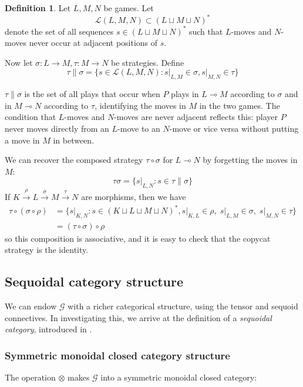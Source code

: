 \documentclass[11pt]{article} %
\theoremstyle{plain} %
\theoremstyle{definition} %
\newtheorem{definition}[theorem]{Definition}
\theoremstyle{exercisestyle}
\newcommand{\map}[3]{#2\xrightarrow{#1} #3}
\newcommand*\from{\colon}
\newcommand{\cmap}[3]{#1\from{}#2\to{}#3}
\newcommand{\tensor}{\otimes}
\renewcommand{\implies}{\multimap}
\newcommand{\comp}[2]{#1 \circ #2}
\newcommand{\cprd}{\sqcup}
\renewcommand{\L}{\mathcal L}
\begin{document}
\begin{definition}
  Let $L,M,N$ be games.  Let
  \[
    \L(L,M,N)\subset (L\cprd M\cprd N)^*
  \]
  denote the set of all sequences $s\in(L\cprd M\cprd N)^*$ such that $L$-moves and $N$-moves never occur at adjacent positions of $s$.  
  
  Now let $\cmap{\sigma}{L}{M},\cmap{\tau}{M}{N}$ be strategies.  Define
  \[
    \tau\|\sigma=\{s\in\L(L,M,N)\colon s\vert_{L,M}\in\sigma, s\vert_{M,N}\in \tau\}
  \]

  $\tau\|\sigma$ is the set of all plays that occur when $P$ plays in $L\implies M$ according to $\sigma$ and in $M\implies N$ according to $\tau$, identifying the moves in $M$ in the two games.  The condition that $L$-moves and $N$-moves are never adjacent reflects this: player $P$ never moves directly from an $L$-move to an $N$-move or vice versa without putting a move in $M$ in between.  
  
  We can recover the composed strategy $\comp\tau\sigma$ for $L\implies N$ by forgetting the moves in $M$:
  \[
    \tau\sigma=\{s\vert_{L,N}\colon s\in\tau\|\sigma\}
  \]
  If $\map{\rho}{K}{L}\xrightarrow{\sigma}\map{\tau}{M}{N}$ are morphisms, then we have
  \begin{align*}
    \comp\tau{(\comp\sigma\rho)}&=\{s\vert_{K,N}\colon s\in(K\cprd L\cprd M\cprd N)^*, s\vert_{K,L}\in\rho,\;s\vert_{L,M}\in\sigma,\;s\vert_{M,N}\in\tau\}\\
                                &= \comp{(\comp\tau\sigma)}\rho
  \end{align*}
  so this composition is associative, and it is easy to check that the copycat strategy is the identity.
\end{definition} 

\subsection{Sequoidal category structure}

We can endow $\mathcal G$ with a richer categorical structure, using the tensor and sequoid connectives.  In investigating this, we arrive at the definition of a \emph{sequoidal category}, introduced in \cite{laird02}.  

\subsubsection{Symmetric monoidal closed category structure}

The operation $\tensor$ makes $\mathcal G$ into a symmetric monoidal closed category:
\end{document}
